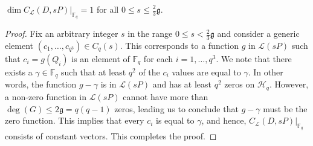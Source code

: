 \documentclass[entropy,article,submit,pdftex,moreauthors]{Definitions/mdpi}
\newcommand{\g}{\mathfrak{g}}
\begin{document}
\begin{Proposition}
$\dim C_\mathcal{L}(D,sP)|_{\mathbb{F}_q}=1$ for all $0\leq s\leq \frac{2}{3}\g$.
\end{Proposition}
\begin{proof}
Fix an arbitrary integer $s$ in the range $0 \leq s <\frac{2}{3}\g$ and consider a generic element $(c_1,\ldots,c_{q^3}) \in C_{q}(s)$. This corresponds to a function $g$ in $\mathscr{L}(sP)$ such that $c_i=g(Q_i)$ is an element of $\mathbb{F}_q$ for each $i=1,\ldots,q^3$. We note that there exists a $\gamma \in \mathbb{F}_q$ such that at least $q^2$ of the $c_i$ values are equal to $\gamma$. In other words, the function $g-\gamma$ is in $\mathscr{L}(sP)$ and has at least $q^2$ zeros on $\mathscr{H}_q$. However, a non-zero function in $\mathscr{L}(sP)$ cannot have more than $\deg(G)\leq 2\g = q(q-1)$ zeros, leading us to conclude that $g-\gamma$ must be the zero function. This implies that every $c_i$ is equal to $\gamma$, and hence, $C_\mathcal{L}(D,sP)|_{\mathbb{F}_q}$ consists of constant vectors. This completes the proof.
\end{proof}








\end{document}
